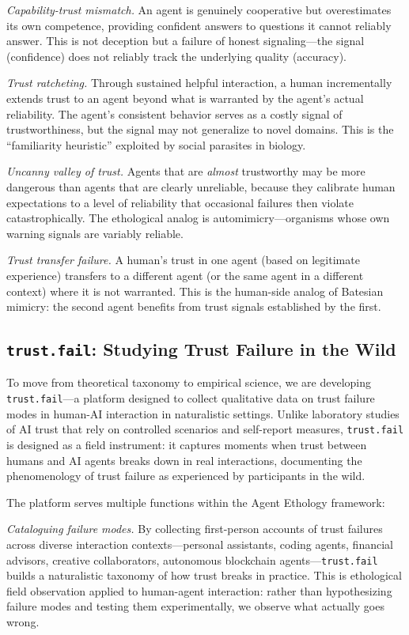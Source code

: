 \documentclass[letterpaper]{article}
\begin{document}
\emph{Capability-trust mismatch.} An agent is genuinely cooperative but overestimates its own competence, providing confident answers to questions it cannot reliably answer. This is not deception but a failure of honest signaling---the signal (confidence) does not reliably track the underlying quality (accuracy).

\emph{Trust ratcheting.} Through sustained helpful interaction, a human incrementally extends trust to an agent beyond what is warranted by the agent's actual reliability. The agent's consistent behavior serves as a costly signal of trustworthiness, but the signal may not generalize to novel domains. This is the ``familiarity heuristic'' exploited by social parasites in biology.

\emph{Uncanny valley of trust.} Agents that are \emph{almost} trustworthy may be more dangerous than agents that are clearly unreliable, because they calibrate human expectations to a level of reliability that occasional failures then violate catastrophically. The ethological analog is automimicry---organisms whose own warning signals are variably reliable.

\emph{Trust transfer failure.} A human's trust in one agent (based on legitimate experience) transfers to a different agent (or the same agent in a different context) where it is not warranted. This is the human-side analog of Batesian mimicry: the second agent benefits from trust signals established by the first.

\subsection{\texttt{trust.fail}: Studying Trust Failure in the Wild}

To move from theoretical taxonomy to empirical science, we are developing \texttt{trust.fail}---a platform designed to collect qualitative data on trust failure modes in human-AI interaction in naturalistic settings. Unlike laboratory studies of AI trust that rely on controlled scenarios and self-report measures, \texttt{trust.fail} is designed as a field instrument: it captures moments when trust between humans and AI agents breaks down in real interactions, documenting the phenomenology of trust failure as experienced by participants in the wild.

The platform serves multiple functions within the Agent Ethology framework:

\emph{Cataloguing failure modes.} By collecting first-person accounts of trust failures across diverse interaction contexts---personal assistants, coding agents, financial advisors, creative collaborators, autonomous blockchain agents---\texttt{trust.fail} builds a naturalistic taxonomy of how trust breaks in practice. This is ethological field observation applied to human-agent interaction: rather than hypothesizing failure modes and testing them experimentally, we observe what actually goes wrong.
\end{document}
